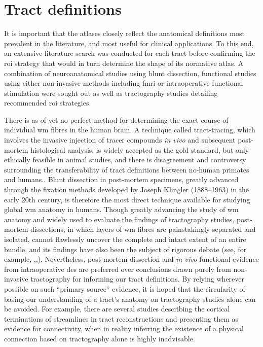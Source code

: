 \section{Tract definitions}

It is important that the atlases closely reflect the anatomical definitions most prevalent in the literature, and most useful for clinical applications.
To this end, an extensive literature search was conducted for each tract before confirming the \gls{roi} strategy that would in turn determine the shape of its normative atlas.
A combination of neuroanatomical studies using blunt dissection, functional studies using either non-invasive methods including \gls{fmri} or intraoperative functional stimulation were sought out as well as tractography studies detailing recommended \gls{roi} strategies.

There is as of yet no perfect method for determining the exact course of individual \gls{wm} fibres in the human brain.
A technique called tract-tracing, which involves the invasive injection of tracer compounds \textit{in vivo} and subsequent post-mortem histological analysis, is widely accepted as the gold standard, but only ethically feasible in animal studies, and there is disagreement and controversy surrounding the transferability of tract definitions between no-human primates and humans.\autocite{Becker2022,ThiebautdeSchotten2012}.
Blunt dissection in post-mortem specimens, greatly advanced through the fixation methods developed by Joseph Klingler (1888--1963) in the early 20th century\autocite{Agrawal2011}, is therefore the most direct technique available for studying global \gls{wm} anatomy in humans.
Though greatly advancing the study of \gls{wm} anatomy and widely used to evaluate the findings of tractography studies, post-mortem dissections, in which layers of \gls{wm} fibres are painstakingly separated and isolated, cannot flawlessly uncover the complete and intact extent of an entire bundle\autocite{Martino2010, Dick2012}, and its findings have also been the subject of rigorous debate (see, for example, \textcite{Giampiccolo2022a},\textcite{Becker2022},\textcite{Giampiccolo2022b}).
Nevertheless, post-mortem dissection and \textit{in vivo} functional evidence from intraoperative \gls{des} are preferred over conclusions drawn purely from non-invasive tractography for informing our tract definitions.
By relying wherever possible on such ``primary source'' evidence, it is hoped that the circularity of basing our understanding of a tract's anatomy on tractography studies alone can be avoided. %
For example, there are several studies describing the cortical terminations of streamlines in tract reconstructions and presenting them as evidence for connectivity\autocite{Conner2018,Hau2016}, when in reality inferring the existence of a physical connection based on tractography alone is highly inadvisable\autocite{Rheault2020}.

